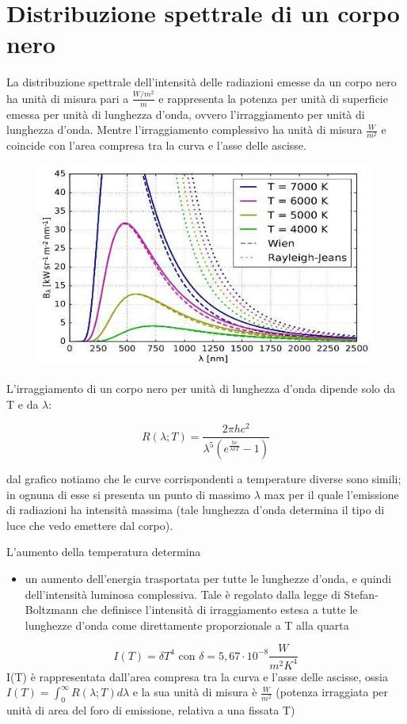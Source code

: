 \documentclass{article}
\theoremstyle{definition}
\begin{document}
\section*{Distribuzione spettrale di un corpo nero}
La distribuzione spettrale dell'intensità delle radiazioni emesse da un corpo nero ha unità di misura pari a \(\frac{W/m^{2}}{m}\) e rappresenta la potenza per unità di superficie emessa per unità di lunghezza d'onda, ovvero l'irraggiamento per unità di lunghezza d'onda. Mentre l'irraggiamento complessivo ha unità di misura \(\frac{W}{m^{2}}\) e coincide con l'area compresa tra la curva e l'asse delle ascisse.\\
\begin{figure}[h!]
    \centering
    \includegraphics[scale=0.5]{corpo-nero.jpg}
    \label{fig:my_label}
\end{figure}
L'irraggiamento di un corpo nero per unità di lunghezza d'onda dipende solo da T e da \(\lambda\):

\begin{equation}
R(\lambda;T) = \frac{2\pi h c^{2}}{\lambda^{5}\left ( e^{\frac{hc}{\lambda kT}}-1\right )}
\end{equation}


dal grafico notiamo che le curve corrispondenti a temperature diverse sono simili; in ognuna di esse si presenta un punto di massimo \(\lambda\) max per il quale l'emissione di radiazioni ha intensità massima (tale lunghezza d'onda determina il tipo di luce che vedo emettere dal corpo).

L'aumento della temperatura determina
\begin{itemize}
\item un aumento dell'energia trasportata per tutte le lunghezze d'onda, e quindi dell'intensità luminosa complessiva. Tale è regolato dalla legge di Stefan-Boltzmann che definisce l'intensità di irraggiamento estesa a tutte le lunghezze d'onda come direttamente proporzionale a T alla quarta
\end{itemize}
\begin{equation}
I(T)=\delta T^{4}     \text{     con  } \delta = 5,67\cdot 10^{-8}\frac{W}{m^{2}K^{4}}
\end{equation}
I(T) è rappresentata dall'area compresa tra la curva e l'asse delle ascisse, ossia \(
I(T) = \int_{0}^{\infty} R(\lambda ; T)d\lambda 
\)
e la sua unità di misura è \(\frac{W}{m^{2}}\) (potenza irraggiata per unità di area del foro di emissione, relativa a una fissata T)
\end{document}
